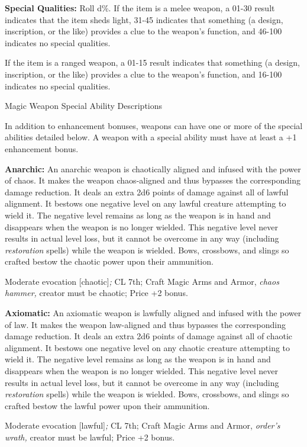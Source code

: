 \documentclass{article}
\begin{document}
\textbf{Special Qualities:} Roll d\%. If the item is a melee weapon, a 01-30 result 
indicates that the item sheds light, 31-45 indicates that something (a design, 
inscription, or the like) provides a clue to the weapon's function, and 46-100 
indicates no special qualities. 

If the item is a ranged weapon, a 01-15 result indicates that something (a design, 
inscription, or the like) provides a clue to the weapon's function, and 16-100 
indicates no special qualities.

\vspace{12pt}
Magic Weapon Special Ability Descriptions

In addition to enhancement bonuses, weapons can have one or more of the special 
abilities detailed below. A weapon with a special ability must have at least a 
+1 enhancement bonus.

\textbf{Anarchic:} An anarchic weapon is chaotically aligned and infused with the 
power of chaos. It makes the weapon chaos-aligned and thus bypasses the corresponding 
damage reduction. It deals an extra 2d6 points of damage against all of lawful 
alignment. It bestows one negative level on any lawful creature attempting to wield 
it. The negative level remains as long as the weapon is in hand and disappears 
when the weapon is no longer wielded. This negative level never results in actual 
level loss, but it cannot be overcome in any way (including \textit{restoration 
}spells) while the weapon is wielded. Bows, crossbows, and slings so crafted bestow 
the chaotic power upon their ammunition.

Moderate evocation [chaotic]\textit{; }CL 7th; Craft Magic Arms and Armor, \textit{chaos 
hammer, }creator must be chaotic; Price +2 bonus.

\textbf{Axiomatic:} An axiomatic weapon is lawfully aligned and infused with the 
power of law. It makes the weapon law-aligned and thus bypasses the corresponding 
damage reduction. It deals an extra 2d6 points of damage against all of chaotic 
alignment. It bestows one negative level on any chaotic creature attempting to 
wield it. The negative level remains as long as the weapon is in hand and disappears 
when the weapon is no longer wielded. This negative level never results in actual 
level loss, but it cannot be overcome in any way (including \textit{restoration 
}spells) while the weapon is wielded. Bows, crossbows, and slings so crafted bestow 
the lawful power upon their ammunition.

Moderate evocation [lawful]\textit{; }CL 7th; Craft Magic Arms and Armor, \textit{order's 
wrath, }creator must be lawful; Price +2 bonus.
\end{document}
